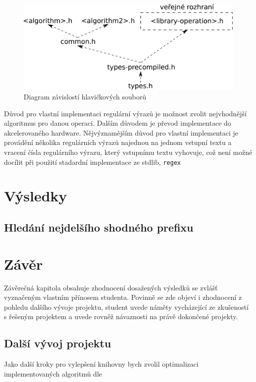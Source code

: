 \begin{figure}[!htb]
\centering
\includegraphics[scale=.25]{fig/header-dependencies.pdf}
\caption{Diagram závislostí hlavičkových souborů}
\label{fig:header-dependecies}
\end{figure}

Důvod pro vlastní implementaci regulární výrazů je možnost zvolit nejvhodnější algoritmus pro danou operaci.
Dalším důvodem je převod implementace do akcelerovaného hardware.
Nějvýznamějším důvod pro vlastní implementaci je provádění několika regulárních výrazů najednou na jednom vstupní textu a vracení čísla regulárního výrazu, který vstupnímu textu vyhovuje, což není možné docílit při použití stadardní implementace ze stdlib, {\tt regex}

\chapter{Výsledky}
\section{Hledání nejdelšího shodného prefixu}

\chapter{Závěr}
Závěrečná kapitola obsahuje zhodnocení dosažených výsledků se zvlášť vyznačeným vlastním přínosem studenta. Povinně se zde objeví i zhodnocení z pohledu dalšího vývoje projektu, student uvede náměty vycházející ze zkušeností s řešeným projektem a uvede rovněž návaznosti na právě dokončené projekty.

\section{Další vývoj projektu}

Jako další kroky pro vylepšení knihovny bych zvolil optimalizaci implementovaných algoritmů dle

